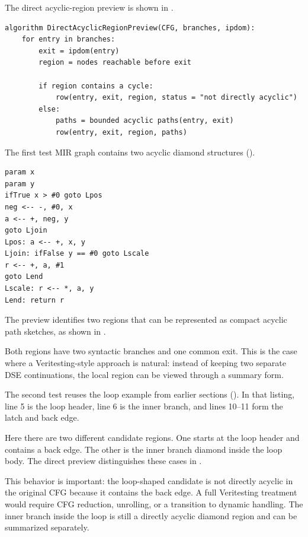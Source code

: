 \documentclass[conference]{IEEEtran}
\begin{document}
The direct acyclic-region preview is shown in
.

\begin{lstlisting}[style=pseudo,caption={Direct acyclic-region preview.},label={lst:acyclic-region-preview}]
algorithm DirectAcyclicRegionPreview(CFG, branches, ipdom):
    for entry in branches:
        exit = ipdom(entry)
        region = nodes reachable before exit

        if region contains a cycle:
            row(entry, exit, region, status = "not directly acyclic")
        else:
            paths = bounded acyclic paths(entry, exit)
            row(entry, exit, region, paths)
\end{lstlisting}

The first test MIR graph contains two acyclic diamond structures
().

\begin{lstlisting}[style=mirfull,caption={Acyclic diamond MIR input.},label={lst:mir-acyclic-diamond}]
param x
param y
ifTrue x > #0 goto Lpos
neg <-- -, #0, x
a <-- +, neg, y
goto Ljoin
Lpos: a <-- +, x, y
Ljoin: ifFalse y == #0 goto Lscale
r <-- +, a, #1
goto Lend
Lscale: r <-- *, a, y
Lend: return r
\end{lstlisting}

The preview identifies two regions that can be represented as compact acyclic
path sketches, as shown in .

Both regions have two syntactic branches and one common exit. This is the case
where a Veritesting-style approach is natural: instead of keeping two separate
DSE continuations, the local region can be viewed through a summary form.

The second test reuses the loop example from earlier sections
(). In that listing, line 5 is the loop header,
line 6 is the inner branch, and lines 10--11 form the latch and back edge.

Here there are two different candidate regions. One starts at the loop header
and contains a back edge. The other is the inner branch diamond inside the loop
body. The direct preview distinguishes these cases in
.

This behavior is important: the loop-shaped candidate is not directly acyclic
in the original CFG because it contains the back edge. A full Veritesting
treatment would require CFG reduction, unrolling, or a transition to dynamic
handling. The inner branch inside the loop is still a directly acyclic diamond
region and can be summarized separately.
\end{document}
